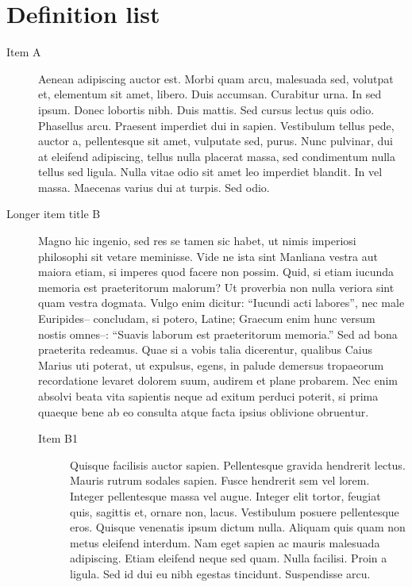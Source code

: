 \documentclass[twoside]{extreport}
\begin{document}
\hypertarget{definition-list}{%
\section{Definition list}\label{definition-list}}

\begin{description}
\item[Item A]
Aenean adipiscing auctor est. Morbi quam arcu, malesuada sed, volutpat
et, elementum sit amet, libero. Duis accumsan. Curabitur urna. In sed
ipsum. Donec lobortis nibh. Duis mattis. Sed cursus lectus quis odio.
Phasellus arcu. Praesent imperdiet dui in sapien. Vestibulum tellus
pede, auctor a, pellentesque sit amet, vulputate sed, purus. Nunc
pulvinar, dui at eleifend adipiscing, tellus nulla placerat massa, sed
condimentum nulla tellus sed ligula. Nulla vitae odio sit amet leo
imperdiet blandit. In vel massa. Maecenas varius dui at turpis. Sed
odio.
\item[Longer item title B]
Magno hic ingenio, sed res se tamen sic habet, ut nimis imperiosi
philosophi sit vetare meminisse. Vide ne ista sint Manliana vestra aut
maiora etiam, si imperes quod facere non possim. Quid, si etiam iucunda
memoria est praeteritorum malorum? Ut proverbia non nulla veriora sint
quam vestra dogmata. Vulgo enim dicitur: ``Iucundi acti labores'', nec
male Euripides-- concludam, si potero, Latine; Graecum enim hunc versum
nostis omnes--: ``Suavis laborum est praeteritorum memoria.'' Sed ad
bona praeterita redeamus. Quae si a vobis talia dicerentur, qualibus
Caius Marius uti poterat, ut expulsus, egens, in palude demersus
tropaeorum recordatione levaret dolorem suum, audirem et plane probarem.
Nec enim absolvi beata vita sapientis neque ad exitum perduci poterit,
si prima quaeque bene ab eo consulta atque facta ipsius oblivione
obruentur.

\begin{description}
\item[Item B1]
Quisque facilisis auctor sapien. Pellentesque gravida hendrerit lectus.
Mauris rutrum sodales sapien. Fusce hendrerit sem vel lorem. Integer
pellentesque massa vel augue. Integer elit tortor, feugiat quis,
sagittis et, ornare non, lacus. Vestibulum posuere pellentesque eros.
Quisque venenatis ipsum dictum nulla. Aliquam quis quam non metus
eleifend interdum. Nam eget sapien ac mauris malesuada adipiscing. Etiam
eleifend neque sed quam. Nulla facilisi. Proin a ligula. Sed id dui eu
nibh egestas tincidunt. Suspendisse arcu.


\end{description}
\end{description}
\end{document}
